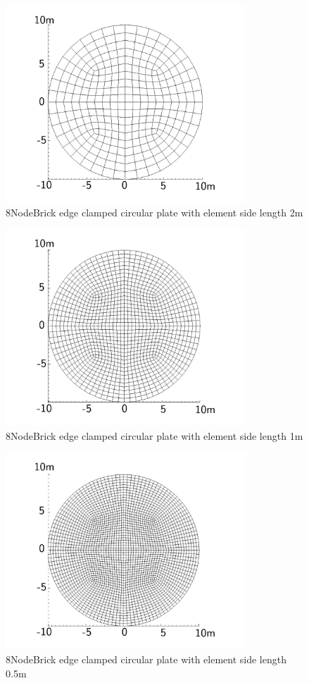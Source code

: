 \documentclass[fleqn,11pt]{article}
\begin{document}
\begin{figure}[H]
  \centering
  \includegraphics[width=9cm]{../Figure-files/circular_plate3.pdf}
  \caption{8NodeBrick edge clamped circular plate with element side length 2m }
  \label{fig 8NodeBrick edges clamped circular plate with element side length 2m }
\end{figure}

\newpage

\begin{figure}[H]
  \centering
  \includegraphics[width=9cm]{../Figure-files/circular_plate4.pdf}
  \caption{8NodeBrick edge clamped circular plate with element side length 1m }
  \label{fig 8NodeBrick edges clamped circular plate with element side length 1m }
\end{figure}


\begin{figure}[H]
  \centering
  \includegraphics[width=9cm]{../Figure-files/circular_plate5.pdf}
  \caption{8NodeBrick edge clamped circular plate with element side length 0.5m }
  \label{fig 8NodeBrick edges clamped circular plate with element side length 0.5m }
\end{figure}
\end{document}
